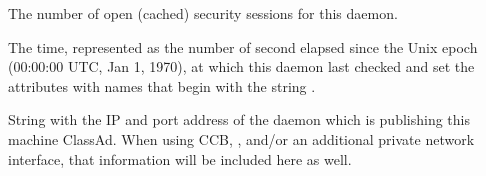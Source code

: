 \begin{description}
\item[\AdAttr{MonitorSelfSecuritySessions}:] The number of open (cached)
  security sessions for this daemon.

\item[\AdAttr{MonitorSelfTime}:] The  time, represented as the number of
  second elapsed since the Unix epoch (00:00:00 UTC, Jan 1, 1970),
  at which this daemon last checked and set the attributes with names that
  begin with the string .
  
\item[\AdAttr{MyAddress}:] String with the IP and port address of the
 daemon which is publishing this machine ClassAd.
When using CCB, , and/or an additional private
network interface, that information will be included here as well.


\end{description}
